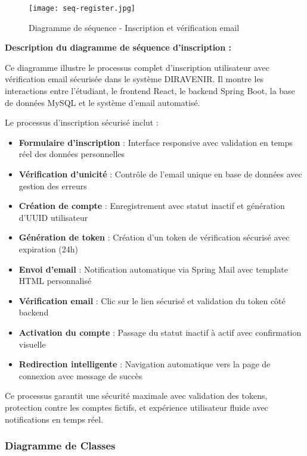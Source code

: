 \documentclass[12pt,a4paper]{report}
\begin{document}
\begin{figure}[H]
\centering
\texttt{[image: seq-register.jpg]}
\caption{Diagramme de séquence - Inscription et vérification email}
\label{fig:diagramme_sequence_inscription}
\end{figure}

\textbf{Description du diagramme de séquence d'inscription :}

Ce diagramme illustre le processus complet d'inscription utilisateur avec vérification email sécurisée dans le système DIRAVENIR. Il montre les interactions entre l'étudiant, le frontend React, le backend Spring Boot, la base de données MySQL et le système d'email automatisé.

Le processus d'inscription sécurisé inclut :
\begin{itemize}
    \item \textbf{Formulaire d'inscription} : Interface responsive avec validation en temps réel des données personnelles
    \item \textbf{Vérification d'unicité} : Contrôle de l'email unique en base de données avec gestion des erreurs
    \item \textbf{Création de compte} : Enregistrement avec statut inactif et génération d'UUID utilisateur
    \item \textbf{Génération de token} : Création d'un token de vérification sécurisé avec expiration (24h)
    \item \textbf{Envoi d'email} : Notification automatique via Spring Mail avec template HTML personnalisé
    \item \textbf{Vérification email} : Clic sur le lien sécurisé et validation du token côté backend
    \item \textbf{Activation du compte} : Passage du statut inactif à actif avec confirmation visuelle
    \item \textbf{Redirection intelligente} : Navigation automatique vers la page de connexion avec message de succès
\end{itemize}

Ce processus garantit une sécurité maximale avec validation des tokens, protection contre les comptes fictifs, et expérience utilisateur fluide avec notifications en temps réel.

\subsubsection{Diagramme de Classes}
\end{document}
